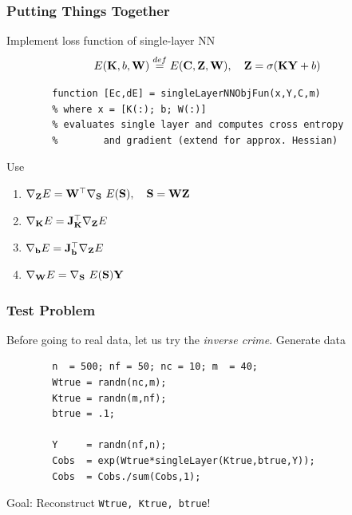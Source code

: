 \documentclass[12pt,fleqn,handout]{beamer}
\begin{document}
\begin{frame}[fragile]
	\frametitle{Putting Things Together}
	
	Implement loss function of single-layer NN
	$$
		E({\bf K},b,{\bf W}) \stackrel{def}{=} E({\bf C},{\bf Z},{\bf W}), \quad {\bf Z} = \sigma({\bf K} {\bf Y}+b)
	$$
	
	
	\begin{verbatim}
		function [Ec,dE] = singleLayerNNObjFun(x,Y,C,m)
		% where x = [K(:); b; W(:)]
		% evaluates single layer and computes cross entropy 
		%        and gradient (extend for approx. Hessian)
	\end{verbatim}

	\bigskip
	
    Use
	\begin{enumerate}
		\item $\nabla_{{\bf Z}} E =  {\bf W}^\top \nabla_{{\bf S}} \ E({\bf S}), \quad {\bf S} = {\bf W}{\bf Z}$
		\item $\nabla_{{\bf K}} E =  {\bf J}_{{\bf K}}^\top \nabla_{{\bf Z}} E$
		\item $\nabla_{{\bf b}} E =  {\bf J}_{{\bf b}}^\top \nabla_{{\bf Z}} E$
		\item $\nabla_{\bfW} E =  \nabla_{\bfS} \ E(\bfS) \bfY $
	\end{enumerate}
	
	
\end{frame}

\begin{frame}[fragile]
	\frametitle{Test Problem}
	
	Before going to real data, let us try the \emph{inverse crime}. Generate data
	\begin{verbatim}
		n  = 500; nf = 50; nc = 10; m  = 40;
		Wtrue = randn(nc,m);
		Ktrue = randn(m,nf);
		btrue = .1;

		Y     = randn(nf,n);
		Cobs  = exp(Wtrue*singleLayer(Ktrue,btrue,Y));
		Cobs  = Cobs./sum(Cobs,1);		
	\end{verbatim}
	
	\begin{center}
	Goal: Reconstruct \texttt{Wtrue, Ktrue, btrue}!  
	\end{center}
\end{frame}
\end{document}
